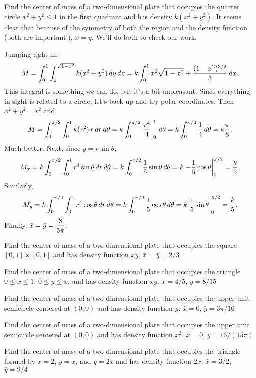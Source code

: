 \example Find the center of mass of a two-dimensional plate 
that occupies the quarter circle $x^2+y^2\le1$ in the
first quadrant and has density
$k(x^2+y^2)$. It seems clear that because of the symmetry of both the
region and the density function (both are important!), $\bar x=\bar
y$. We'll do both to check our work.

Jumping right in:
$$
M=\int_0^1 \int_0^{\sqrt{1-x^2}} k(x^2+y^2)\,dy\,dx
=k\int_0^1 x^2\sqrt{1-x^2}+{(1-x^2)^{3/2}\over3}\,dx.
$$
This integral is something we can do, but it's a bit unpleasant. Since
everything in sight is related to a circle, let's back up and try
polar coordinates. Then $x^2+y^2=r^2$ and
$$M=\int_0^{\pi/2} \int_0^{1} k(r^2)\,r\,dr\,d\theta
=k\int_0^{\pi/2}\left.{r^4\over4}\right|_0^1\,d\theta
=k\int_0^{\pi/2} {1\over4}\,d\theta
=k{\pi\over8}.
$$
Much better. Next, since $y=r\sin\theta$,
$$M_x=k\int_0^{\pi/2} \int_0^{1} r^4\sin\theta\,dr\,d\theta
=k\int_0^{\pi/2} {1\over5}\sin\theta\,d\theta
=k\left.-{1\over5}\cos\theta\right|_0^{\pi/2}={k\over5}.
$$
Similarly,
$$M_y=k\int_0^{\pi/2} \int_0^{1} r^4\cos\theta\,dr\,d\theta
=k\int_0^{\pi/2} {1\over5}\cos\theta\,d\theta
=k\left.{1\over5}\sin\theta\right|_0^{\pi/2}={k\over5}.
$$
Finally, $\displaystyle\bar x = \bar y = {8\over5\pi}$.
\endexample

\exercises

\exercise Find the center of mass of a two-dimensional plate 
that occupies the square $[0,1]\times[0,1]$
and has density
function $xy$.
\answer $\bar x=\bar y=2/3$
\endanswer
\endexercise

\exercise Find the center of mass of a two-dimensional plate 
that occupies the triangle $0\le x\le1$, $0\le y\le x$,
and has density
function $xy$.
\answer $\bar x=4/5$, $\bar y=8/15$
\endanswer
\endexercise

\exercise Find the center of mass of a two-dimensional plate 
that occupies the upper unit semicircle centered at $(0,0)$
and has density
function $y$.
\answer $\bar x=0$, $\bar y=3\pi/16$
\endanswer
\endexercise

\exercise Find the center of mass of a two-dimensional plate 
that occupies the upper unit semicircle centered at $(0,0)$
and has density
function $x^2$.
\answer $\bar x=0$, $\bar y=16/(15\pi)$
\endanswer

\endexercise

\exercise Find the center of mass of a two-dimensional plate 
that occupies the triangle formed by $x=2$, $y=x$, and $y=2x$
and has density
function $2x$.
\answer $\bar x=3/2$, $\bar y=9/4$
\endanswer
\endexercise

